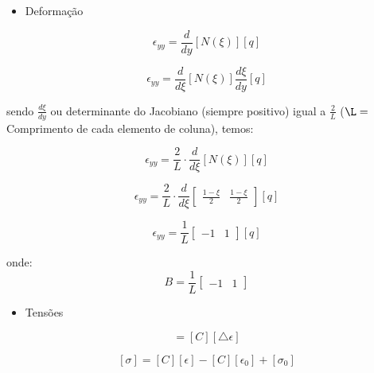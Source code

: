 \documentclass{article} %
\begin{document}
\begin{itemize}
	\item Deformação
\end{itemize}

\begin{equation}
\epsilon_{yy}=\frac{d}{dy}[N(\xi)][q]
\end{equation}

\begin{equation*}
\epsilon_{yy}=\frac{d}{d\xi}[N(\xi)]\frac{d\xi}{dy}[q]
\end{equation*}
 
 \indent sendo \(\frac{d\xi}{dy}\) ou determinante do Jacobiano (siempre positivo) igual a \(\frac{2}{L}\) (\(\L=\) Comprimento de cada elemento de coluna), temos:
 
\begin{equation}\label{def}
\epsilon_{yy}=\frac{2}{L}\cdot\frac{d}{d\xi}[N(\xi)][q]
\end{equation}

\begin{equation*}
\epsilon_{yy}=\frac{2}{L}\cdot\frac{d}{d\xi}\begin{bmatrix}
\frac{1-\xi}{2}&\frac{1-\xi}{2}
\end{bmatrix}[q]
\end{equation*}

\begin{equation}\label{defor}
\epsilon_{yy}=\frac{1}{L}\begin{bmatrix}
-1&1
\end{bmatrix}[q]
\end{equation}

\indent onde:
\begin{equation}\label{matrizb}
 B=\frac{1}{L}\begin{bmatrix}
-1&1
\end{bmatrix}
\end{equation}

\begin{itemize}
	\item Tensões
\end{itemize}

\begin{equation}
[\triangle\sigma]=[C][\triangle\epsilon]
\end{equation}

\begin{equation}\label{ten}
[\sigma]=[C][\epsilon]-[C][\epsilon_0]+[\sigma_0]
\end{equation}
\end{document}
